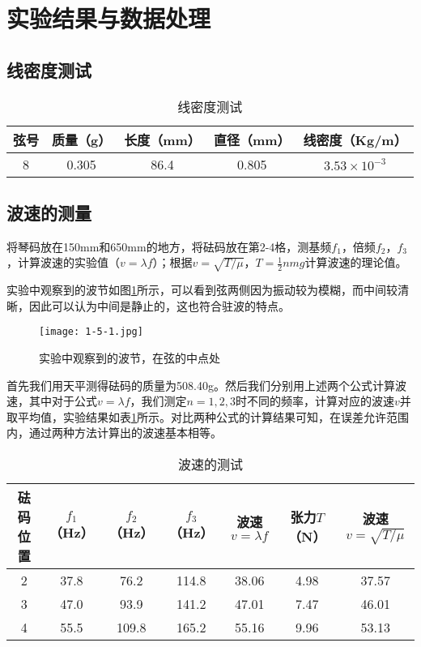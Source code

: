 \documentclass[12pt]{article}
\begin{document}
\section{实验结果与数据处理}
\subsection{线密度测试}
\begin{table}[htbp]
    \centering
    \begin{tabular}{|c|c|c|c|c|}
        \hline
        弦号 & 质量（g） & 长度（mm） & 直径（mm） & 线密度（Kg/m） \\
        \hline
        8 & 0.305 & 86.4 & 0.805 & $3.53\times10^{-3}$ \\
        \hline        
    \end{tabular}
    \caption{线密度测试}
\end{table}

\subsection{波速的测量}
将琴码放在150mm和650mm的地方，将砝码放在第2-4格，测基频$f_1$，倍频$f_2$，$f_3$，计算波速的实验值（$v=\lambda f$）；根据$v=\sqrt{T/\mu}$，$T=\frac{1}{2}nmg$计算波速的理论值。

实验中观察到的波节如图\ref{fig:2}所示，可以看到弦两侧因为振动较为模糊，而中间较清晰，因此可以认为中间是静止的，这也符合驻波的特点。

\begin{figure}[htbp]
    \centering
    \texttt{[image: 1-5-1.jpg]}
    \caption{实验中观察到的波节，在弦的中点处}
    \label{fig:2}
\end{figure}

首先我们用天平测得砝码的质量为508.40g。然后我们分别用上述两个公式计算波速，其中对于公式$v=\lambda f$，我们测定$n=1,2,3$时不同的频率，计算对应的波速$v$并取平均值，实验结果如表\ref{tab:2}所示。对比两种公式的计算结果可知，在误差允许范围内，通过两种方法计算出的波速基本相等。

\newpage

\begin{table}[htbp]
    \centering
    \begin{tabular}{|c|c|c|c|c|c|c|}
        \hline
        砝码位置 & $f_1$（Hz） & $f_2$（Hz） & $f_3$（Hz） & 波速$v=\lambda f$ & 张力$T$（N） & 波速$v=\sqrt{T/\mu}$ \\
        \hline
        2    & 37.8 & 76.2 & 114.8 & 38.06 & 4.98 & 37.57 \\
        \hline
        3    & 47.0 & 93.9 & 141.2 & 47.01 & 7.47 & 46.01 \\
        \hline
        4    & 55.5 & 109.8 & 165.2 & 55.16 & 9.96 & 53.13 \\
        \hline
    \end{tabular}%
    \label{tab:2}
    \caption{波速的测试}
\end{table}%
\end{document}
